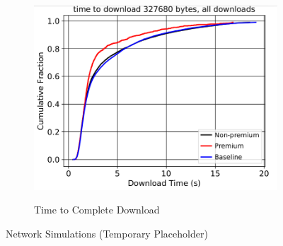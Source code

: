 \begin{figure}
\begin{subfigure}[t]{0.32\textwidth}
\includegraphics[scale=0.2]{images/ttdownload_temp.png}
		\label{fig:payments_c}
		\caption{Time to Complete Download}
	\end{subfigure}
	\label{fig:payments}
	\caption{Network Simulations (Temporary Placeholder)}
\end{figure}

